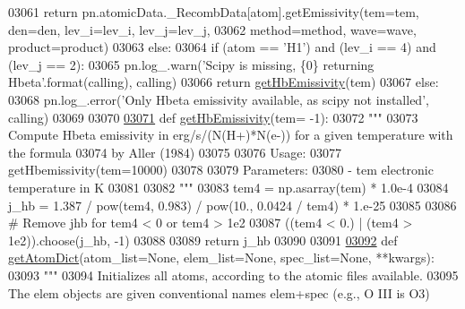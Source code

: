 \begin{DoxyCode}
{{{{{{{{{{{{{{{{{{{{{{03061         \textcolor{keywordflow}{return} pn.atomicData.\_RecombData[atom].getEmissivity(tem=tem, den=den, lev\_i=lev\_i, lev\_j=lev\_j,
03062                                                              method=method, wave=wave, product=product)
03063     \textcolor{keywordflow}{else}:
03064         \textcolor{keywordflow}{if} (atom == \textcolor{stringliteral}{'H1'}) \textcolor{keywordflow}{and} (lev\_i == 4) \textcolor{keywordflow}{and} (lev\_j == 2):
03065             pn.log\_.warn(\textcolor{stringliteral}{'Scipy is missing, \{0\} returning Hbeta'}.format(calling), calling)
03066             \textcolor{keywordflow}{return} \hyperlink{namespacepyneb_1_1core_1_1pynebcore_a027537ead17492a35c3e4e940cd95223}{getHbEmissivity}(tem)
03067         \textcolor{keywordflow}{else}:
03068             pn.log\_.error(\textcolor{stringliteral}{'Only Hbeta emissivity available, as scipy not installed'}, calling)
03069 
03070 
\hypertarget{pynebcore_8py_source_l03071}{}\hyperlink{namespacepyneb_1_1core_1_1pynebcore_a027537ead17492a35c3e4e940cd95223}{03071} \textcolor{keyword}{def }\hyperlink{namespacepyneb_1_1core_1_1pynebcore_a027537ead17492a35c3e4e940cd95223}{getHbEmissivity}(tem= -1):
03072     \textcolor{stringliteral}{""" }
03073 \textcolor{stringliteral}{    Compute Hbeta emissivity in erg/s/(N(H+)*N(e-)) for a given temperature with the formula }
03074 \textcolor{stringliteral}{        by Aller (1984)}
03075 \textcolor{stringliteral}{}
03076 \textcolor{stringliteral}{    Usage:}
03077 \textcolor{stringliteral}{        getHbemissivity(tem=10000)}
03078 \textcolor{stringliteral}{}
03079 \textcolor{stringliteral}{    Parameters:}
03080 \textcolor{stringliteral}{        - tem     electronic temperature in K}
03081 \textcolor{stringliteral}{}
03082 \textcolor{stringliteral}{    """} 
03083     tem4 = np.asarray(tem) * 1.0e-4
03084     j\_hb = 1.387 / pow(tem4, 0.983) / pow(10., 0.0424 / tem4) * 1.e-25
03085 
03086     \textcolor{comment}{# Remove jhb for tem4 < 0 or tem4 > 1e2}
03087     ((tem4 < 0.) | (tem4 > 1e2)).choose(j\_hb, -1)
03088 
03089     \textcolor{keywordflow}{return} j\_hb
03090 
03091 
\hypertarget{pynebcore_8py_source_l03092}{}\hyperlink{namespacepyneb_1_1core_1_1pynebcore_a4e1b2e2f554c7c9c0b76419a45b2ee59}{03092} \textcolor{keyword}{def }\hyperlink{namespacepyneb_1_1core_1_1pynebcore_a4e1b2e2f554c7c9c0b76419a45b2ee59}{getAtomDict}(atom\_list=None, elem\_list=None, spec\_list=None, **kwargs):
03093     \textcolor{stringliteral}{""" }
03094 \textcolor{stringliteral}{    Initializes all atoms, according to the atomic files available.}
03095 \textcolor{stringliteral}{    The elem objects are given conventional names elem+spec (e.g., O III is O3)}
}}}}}}}}}}}}}}}}}}}}}}
\end{DoxyCode}
